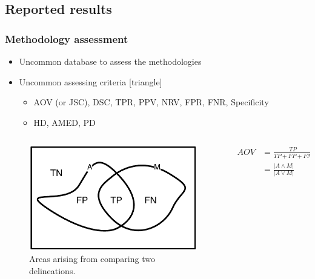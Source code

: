 \subsection{Reported results}
\begin{frame} \frametitle{Methodology assessment}
\begin{itemize}
\item Uncommon database to assess the methodologies
\item Uncommon assessing criteria
[triangle]
\begin{itemize}
\item AOV (or JSC), DSC, TPR, PPV, NRV, FPR, FNR, Specificity
\item HD, AMED, PD
\end{itemize}
\end{itemize}
\begin{columns}
\begin{column}{.5\textwidth}
\begin{figure}
\includegraphics[width=.7\textwidth]{aor}
\caption{Areas arising from comparing two delineations.}
\end{figure}
\end{column}
\begin{column}{.5\textwidth}
\vspace{-20pt}
\setlength{\jot}{10pt}%
\begin{align*}
AOV &= \frac{TP}{TP+FP+FN} \\ 
		 &=\frac{|A \wedge M|}{|A \vee M|} \qquad \in [0,1]
\end{align*}

\end{column}
\end{columns}
\end{frame}

